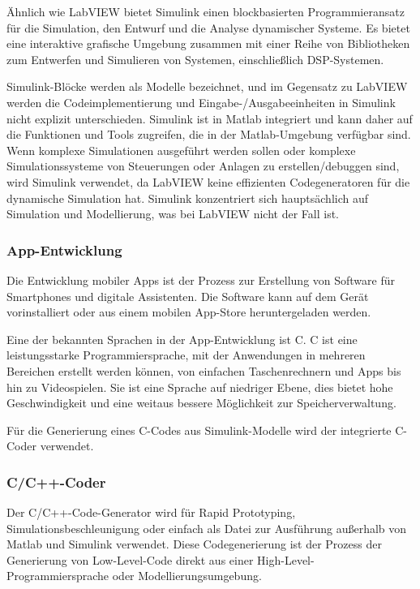 Ähnlich wie LabVIEW bietet Simulink einen blockbasierten Programmieransatz für die Simulation, den Entwurf und die Analyse dynamischer Systeme. Es bietet eine interaktive grafische Umgebung zusammen mit einer Reihe von Bibliotheken zum Entwerfen und Simulieren von Systemen, einschließlich DSP-Systemen. 

Simulink-Blöcke werden als Modelle bezeichnet, und im Gegensatz zu LabVIEW werden die Codeimplementierung und Eingabe-/Ausgabeeinheiten in Simulink nicht explizit unterschieden. Simulink ist in Matlab integriert und kann daher auf die Funktionen und Tools zugreifen, die in der Matlab-Umgebung verfügbar sind. \citep{Kehtarnavaz2006} \citep{Cansalar2015}\\
Wenn komplexe Simulationen ausgeführt werden sollen oder komplexe Simulationssysteme von Steuerungen oder Anlagen zu erstellen/debuggen sind, wird Simulink verwendet, da LabVIEW keine effizienten Codegeneratoren für die dynamische Simulation hat.
Simulink konzentriert sich hauptsächlich auf Simulation und Modellierung, was bei LabVIEW nicht der Fall ist.


\subsubsection{App-Entwicklung}
Die Entwicklung mobiler Apps ist der Prozess zur Erstellung von Software für Smartphones und digitale Assistenten. Die Software kann auf dem Gerät vorinstalliert oder aus einem mobilen App-Store heruntergeladen werden. 

Eine der bekannten Sprachen in der App-Entwicklung ist C.
C ist eine leistungsstarke Programmiersprache, mit der Anwendungen in mehreren Bereichen erstellt werden können, von einfachen Taschenrechnern und Apps bis hin zu Videospielen. Sie ist eine Sprache auf niedriger Ebene, dies bietet hohe Geschwindigkeit und eine weitaus bessere Möglichkeit zur Speicherverwaltung.

Für die Generierung eines C-Codes aus Simulink-Modelle wird der integrierte C-Coder verwendet.

\subsubsection{C/C++-Coder}
Der C/C++-Code-Generator wird für Rapid Prototyping, Simulationsbeschleunigung oder einfach als Datei zur Ausführung außerhalb von Matlab und Simulink verwendet.
Diese Codegenerierung ist der Prozess der Generierung von Low-Level-Code direkt aus einer High-Level-Programmiersprache oder Modellierungsumgebung.

